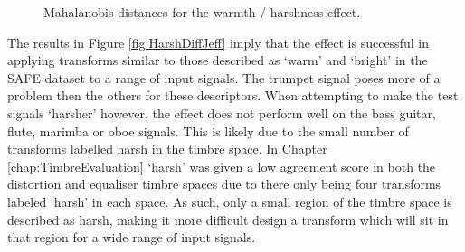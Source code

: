 		\begin{figure}[h!]
			\centering
			\quad
			\caption{Mahalanobis distances for the warmth / harshness effect.}
			\label{fig:HarshJeffs}
		\end{figure}

		The results in Figure \ref{fig:HarshDiffJeff} imply that the effect is successful in applying transforms
		similar to those described as `warm' and `bright' in the SAFE dataset to a range of input signals. The
		trumpet signal poses more of a problem then the others for these descriptors. When attempting to make the
		test signals `harsher' however, the effect does not perform well on the bass guitar, flute, marimba or oboe
		signals. This is likely due to the small number of transforms labelled harsh in the timbre space. In Chapter
		\ref{chap:TimbreEvaluation} `harsh' was given a low agreement score in both the distortion and equaliser
		timbre spaces due to there only being four transforms labeled `harsh' in each space. As such, only a small
		region of the timbre space is described as harsh, making it more difficult design a transform which will sit
		in that region for a wide range of input signals.

